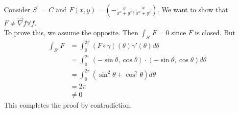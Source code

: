 \documentclass[12pt]{article}
\begin{document}
\begin{ex}
    Consider $S^1 = C$ and $F(x,y) = \left(-\frac{y}{x^2+y^2}, \frac{x}{x^2+y^2}\right)$. We want to show that $F \ne \vec\nabla f \forall f$. \\
    To prove this, we assume the opposite. Then $\int_{S'} F = 0$ since $F$ is closed. But
    \begin{align*}
        \int_{S'} F &= \int_0^{2\pi} (F\circ\gamma)(\theta)\gamma'(\theta)d\theta \\
                    &= \int_0^{2\pi} (-\sin\theta, \cos\theta) \cdot (-\sin\theta, \cos\theta) d\theta \\
                    &= \int_0^{2\pi} \left(\sin^2\theta + \cos^2\theta\right)d\theta \\
                    &= 2\pi \\
                    &\ne 0
    \end{align*}
    This completes the proof by contradiction.
\end{ex}
\end{document}
